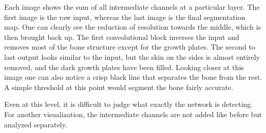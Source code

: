 Each image shows the sum of all intermediate channels at a particular layer. The first image is the raw input, whereas the last image is the final segmentation map. One can clearly see the reduction of resolution towards the middle, which is then brought back up. The first convolutional block inverses the input and removes most of the bone structure except for the growth plates. The second to last output looks similar to the input, but the skin on the sides is almost entirely removed, and the dark growth plates have been filled. Looking closer at this image one can also notice a crisp black line that separates the bone from the rest. A simple threshold at this point would segment the bone fairly accurate.

Even at this level, it is difficult to judge what exactly the network is detecting. For another visualization, the intermediate channels are not added like before but analyzed separately.

